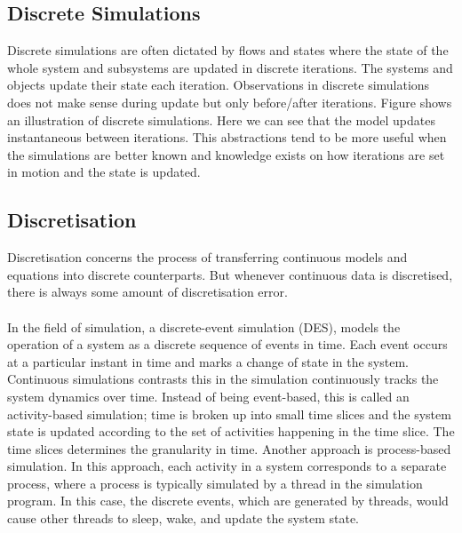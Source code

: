 \subsection{Discrete Simulations}
Discrete simulations are often dictated by flows and states where the state of the whole system and subsystems are updated in discrete iterations. The systems and objects update their state each iteration. Observations in discrete simulations does not make sense during update but only before/after iterations. Figure  shows an illustration of discrete simulations. Here we can see that the model updates instantaneous between iterations. This abstractions tend to be more useful when the simulations are better known and knowledge exists on how iterations are set in motion and the state is updated.


\subsection{Discretisation}\label{dis}

Discretisation concerns the process of transferring continuous models and equations into discrete counterparts. But whenever continuous data is discretised, there is always some amount of discretisation error.
\\\\ %
In the field of simulation, a discrete-event simulation (DES), models the operation of a system as a discrete sequence of events in time. Each event occurs at a particular instant in time and marks a change of state in the system.
Continuous simulations contrasts this in the simulation continuously tracks the system dynamics over time. Instead of being event-based, this is called an activity-based simulation; time is broken up into small time slices and the system state is updated according to the set of activities happening in the time slice. The time slices determines the granularity in time.
Another approach is process-based simulation. In this approach, each activity in a system corresponds to a separate process, where a process is typically simulated by a thread in the simulation program. In this case, the discrete events, which are generated by threads, would cause other threads to sleep, wake, and update the system state.



